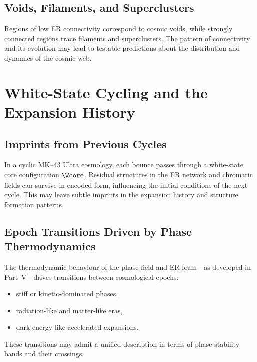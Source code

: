 \section{Voids, Filaments, and Superclusters}

Regions of low ER connectivity correspond to cosmic voids, while strongly connected regions trace filaments and superclusters.
The pattern of connectivity and its evolution may lead to testable predictions about the distribution and dynamics of the cosmic web.


\chapter{White-State Cycling and the Expansion History}

\section{Imprints from Previous Cycles}

In a cyclic MK--43 Ultra cosmology, each bounce passes through a white-state core configuration $\Wcore$.
Residual structures in the ER network and chromatic fields can survive in encoded form, influencing the initial conditions of the next cycle.
This may leave subtle imprints in the expansion history and structure formation patterns.

\section{Epoch Transitions Driven by Phase Thermodynamics}

The thermodynamic behaviour of the phase field and ER foam---as developed in Part~V---drives transitions between cosmological epochs:
\begin{itemize}
  \item stiff or kinetic-dominated phases,
  \item radiation-like and matter-like eras,
  \item dark-energy-like accelerated expansions.
\end{itemize}
These transitions may admit a unified description in terms of phase-stability bands and their crossings.

